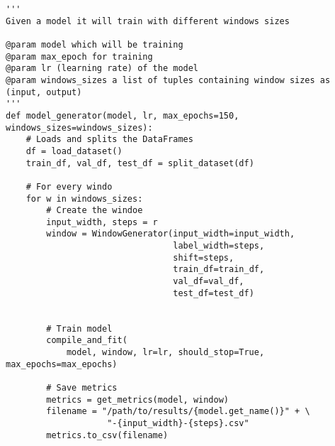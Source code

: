 \begin{verbatim}
'''
Given a model it will train with different windows sizes

@param model which will be training
@param max_epoch for training
@param lr (learning rate) of the model
@param windows_sizes a list of tuples containing window sizes as (input, output)
'''
def model_generator(model, lr, max_epochs=150, windows_sizes=windows_sizes):
    # Loads and splits the DataFrames
    df = load_dataset()
    train_df, val_df, test_df = split_dataset(df)
    
    # For every windo
    for w in windows_sizes:
        # Create the windoe
        input_width, steps = r
        window = WindowGenerator(input_width=input_width,
                                 label_width=steps,
                                 shift=steps,
                                 train_df=train_df,
                                 val_df=val_df,
                                 test_df=test_df)

        
        # Train model
        compile_and_fit(
            model, window, lr=lr, should_stop=True, max_epochs=max_epochs)
        
        # Save metrics
        metrics = get_metrics(model, window)
        filename = "/path/to/results/{model.get_name()}" + \
                    "-{input_width}-{steps}.csv"
        metrics.to_csv(filename)
\end{verbatim}
